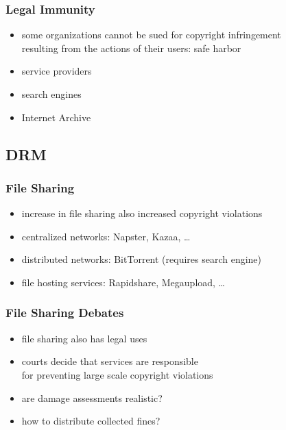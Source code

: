 \documentclass[dvipsnames]{beamer}
\theoremstyle{plain}
\begin{document}
%

\begin{frame}
  \frametitle{Legal Immunity}

  \begin{itemize}
    \item some organizations cannot be sued for copyright infringement\\
      resulting from the actions of their users: \alert{safe harbor}

    \medskip
    \item service providers
    \item search engines
    \item Internet Archive
  \end{itemize}
\end{frame}

\subsection{DRM}

\begin{frame}
  \frametitle{File Sharing}

  \begin{itemize}
    \item increase in file sharing also increased copyright violations
    \item centralized networks: Napster, Kazaa, \ldots
    \item distributed networks: BitTorrent (requires search engine)
    \item file hosting services: Rapidshare, Megaupload, \ldots
  \end{itemize}
\end{frame}

\begin{frame}
  \frametitle{File Sharing Debates}

  \begin{itemize}
    \item file sharing also has legal uses
    \item courts decide that services are responsible\\
      for preventing large scale copyright violations
    \item are damage assessments realistic?
    \item how to distribute collected fines?
  \end{itemize}
\end{frame}
\end{document}
